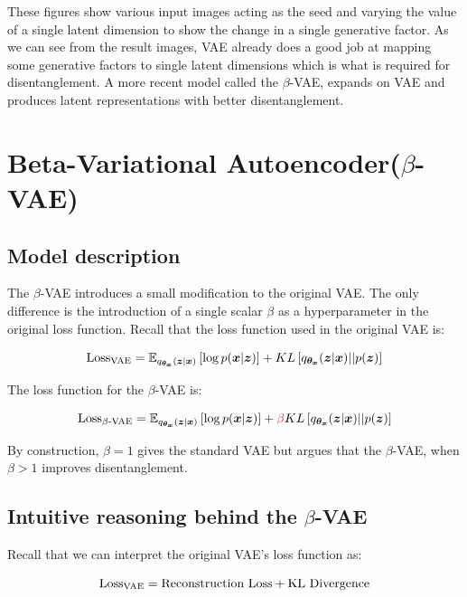             These figures show various input images acting as the seed and varying the value of a single latent dimension to show the change in a single generative factor. As we can see from the result images, VAE already does a good job at mapping some generative factors to single latent dimensions which is what is required for disentanglement. A more recent model called the $\beta$-VAE, expands on VAE and produces latent representations with better disentanglement.
            
    \section{Beta-Variational Autoencoder($\beta$-VAE)}
        \subsection{Model description}
            The $\beta$-VAE \citep{higgins2017beta} introduces a small modification to the original VAE. The only difference is the introduction of a single scalar $\beta$ as a hyperparameter in the original loss function. Recall that the loss function used in the original VAE is:
            
            \[ \text{Loss\textsubscript{VAE}} = \mathbb{E}_{q_{\bm{\theta_x}}(\bm{z}|\bm{x})} \left[\log p(\bm{x} | \bm{z}) \right] + KL\left[q_{\bm{\theta_x}}(\bm{z}|\bm{x}) || p(\bm{z})\right] \]
            
            The loss function for the $\beta$-VAE is:
            
            \[ \text{Loss\textsubscript{$\beta$-VAE}} = \mathbb{E}_{q_{\bm{\theta_x}}(\bm{z}|\bm{x})} \left[\log p(\bm{x} | \bm{z}) \right] + \textcolor{red}{\beta} KL\left[q_{\bm{\theta_x}}(\bm{z}|\bm{x}) || p(\bm{z})\right] \]
            
            By construction, $\beta=1$ gives the standard VAE but \cite{higgins2017beta} argues that the $\beta$-VAE, when $\beta>1$ improves disentanglement.
            
        \subsection{Intuitive reasoning behind the $\beta$-VAE} \label{subsec:beta_reasoning}
            Recall that we can interpret the original VAE's loss function as:
            
            \[ \text{Loss\textsubscript{VAE}} = \text{Reconstruction Loss} + \text{KL Divergence} \]
            
